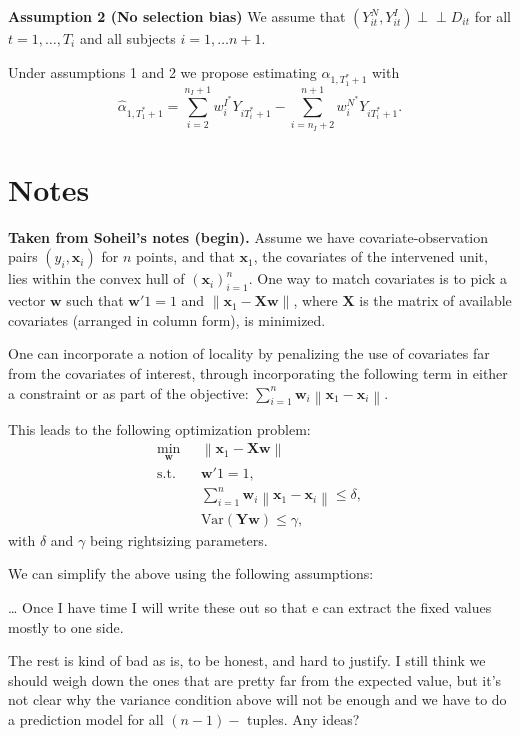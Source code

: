 \documentclass[11pt]{article}
\newcommand{\w}{\textbf{w}}
\newcommand{\x}{\textbf{x}}
\newcommand{\X}{\textbf{X}}
\newcommand{\Y}{\textbf{Y}}
\newcommand{\Tstar}{T^{\textstyle{*}}}
\newcommand{\wstarI}{w^{I^{\textstyle{*}}}}
\newcommand{\wstarN}{w^{N^{\textstyle{*}}}}
\newcommand{\norm}[1]{\left\lVert#1\right\rVert}
\newcommand{\indep}{\perp\!\!\!\perp}
\newcommand\red[1]{{\color{red}#1}}
\begin{document}
\vspace*{0.5cm}
\noindent\textbf{Assumption 2 (No selection bias)} We assume that $(Y_{it}^N,Y_{it}^I) \indep D_{it}$ for all $t = 1,\ldots,T_i$ and all subjects $i = 1,\ldots n+1$.
\vspace*{0.5cm}

Under assumptions 1 and 2 we propose estimating $\alpha_{1,\Tstar_1+1}$ with 
$$
  \widehat{\alpha}_{1,\Tstar_1+1} = \sum_{i=2}^{n_I + 1} \wstarI_i Y_{i\Tstar_i+1} - \sum_{i=n_I + 2}^{n + 1} \wstarN_i Y_{i\Tstar_i+1}.
$$





\section*{Notes}
{\bf Taken from Soheil's notes (begin).}
Assume we have covariate-observation pairs $(y_i, \x_i)$ for $n$ points, and 
that $\x_1$, the covariates of the intervened unit, lies within the convex hull 
of $(\x_i)_{i=1}^n$. One way to match covariates is to pick a vector $\w$ such 
that $\w'1=1$ and $\norm{\x_1 - \X\w}$, where $\X$ is the matrix of available 
covariates (arranged in column form), is minimized.

One can incorporate a notion of locality by penalizing the use of covariates 
far from the covariates of interest, through incorporating the following term 
in either a constraint or as part of the objective:
$\sum_{i=1}^n \w_i \norm{\x_1 - \x_i}$.

This leads to the following optimization problem:
\begin{align*}
\min_{\w} ~~~& \norm{\x_1 - \X\w}\\
\text{s.t.}~~~& \w'1=1,\\
& \sum_{i=1}^n \w_i\norm{\x_1 - \x_i} \leq \delta, \\
& \text{Var}(\Y\w)\leq \gamma,
\end{align*}
with $\delta$ and $\gamma$ being rightsizing parameters. 

We can simplify the above using the following assumptions:

\ldots
\red{Once I have time I will write these out so that e can extract the fixed values mostly to one side.}


\red{The rest is kind of bad as is, to be honest, and hard to justify. I still think we should weigh down the ones that are pretty far from the expected value, but it's not clear why the variance condition above will not be enough and we have to do a prediction model for all $(n-1)-$ tuples. Any ideas?}
\end{document}
